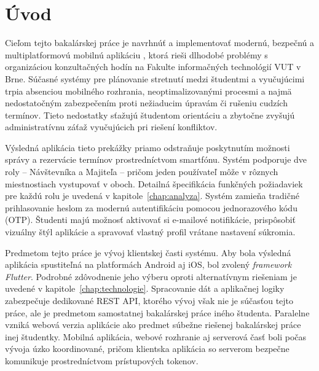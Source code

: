 \chapter{Úvod}\label{chap:uvod}
Cieľom tejto bakalárskej práce je navrhnúť a implementovať modernú, bezpečnú a multiplatformovú mobilnú aplikáciu , ktorá rieši dlhodobé problémy s organizáciou konzultačných hodín na Fakulte informačných technológií VUT v Brne. Súčasné systémy pre plánovanie stretnutí medzi študentmi a vyučujúcimi trpia absenciou mobilného rozhrania, neoptimalizovanými procesmi a najmä nedostatočným zabezpečením proti nežiaducim úpravám či rušeniu cudzích termínov. Tieto nedostatky sťažujú študentom orientáciu a zbytočne zvyšujú administratívnu záťaž vyučujúcich pri riešení konfliktov.

Výsledná aplikácia tieto prekážky priamo odstraňuje poskytnutím možnosti 
správy a rezervácie termínov prostredníctvom smartfónu. Systém podporuje 
dve roly – Návštevníka a Majiteľa – pričom jeden používateľ môže 
v rôznych miestnostiach vystupovať v oboch. Detailná špecifikácia 
funkčných požiadaviek pre každú rolu je uvedená v kapitole~\ref{chap:analyza}. 
Systém zamieňa tradičné prihlasovanie heslom za modernú autentifikáciu 
pomocou jednorazového kódu (OTP). Študenti majú možnosť aktivovať si 
e-mailové notifikácie, prispôsobiť vizuálny štýl aplikácie a spravovať 
vlastný profil vrátane nastavení súkromia.

Predmetom tejto práce je vývoj klientskej časti systému. Aby bola výsledná aplikácia spustiteľná na platformách Android aj iOS, bol zvolený \textit{framework Flutter}. Podrobné zdôvodnenie jeho výberu oproti alternatívnym riešeniam je uvedené v kapitole~\ref{chap:technologie}. Spracovanie dát a aplikačnej logiky zabezpečuje dedikované REST API, ktorého vývoj však nie je súčasťou tejto práce, ale je predmetom samostatnej bakalárskej práce iného študenta. Paralelne vzniká webová verzia aplikácie ako predmet súbežne riešenej bakalárskej práce inej študentky. Mobilná aplikácia, webové rozhranie aj serverová časť boli počas vývoja úzko koordinované, pričom klientska aplikácia so serverom bezpečne komunikuje prostredníctvom prístupových tokenov.
